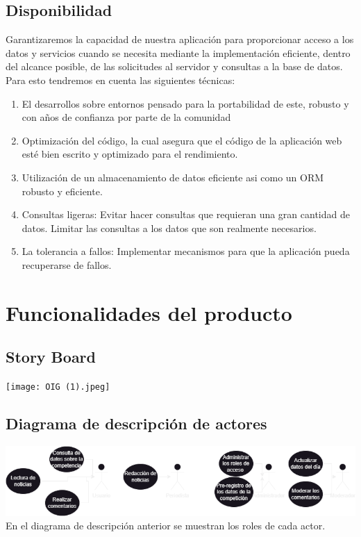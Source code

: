\documentclass{article} %
\begin{document}
\subsection{Disponibilidad}
 Garantizaremos la capacidad de nuestra aplicación para proporcionar
acceso a los datos y servicios cuando se necesita mediante la implementación eficiente,
dentro del alcance posible, de las solicitudes al servidor y consultas a la base de datos. Para
esto tendremos en cuenta las siguientes técnicas:
\begin{enumerate}
    \item El desarrollos sobre entornos pensado para la portabilidad de este, robusto y con años de confianza por parte de la comunidad
    \item Optimización del código, la cual asegura que el código de la aplicación web esté bien escrito y
optimizado para el rendimiento.
\item Utilización de un almacenamiento de datos eficiente asi como un ORM robusto y eficiente.
\item Consultas ligeras: Evitar hacer consultas que requieran una gran cantidad de datos.
Limitar las consultas a los datos que son realmente necesarios.
\item La tolerancia a fallos: Implementar mecanismos para que la aplicación pueda
recuperarse de fallos.

\end{enumerate}

\section{Funcionalidades del producto}
  \subsection{Story Board}
         \texttt{[image: OIG (1).jpeg]}
         
         \subsection{Diagrama de descripción de actores}
         \includegraphics[width=\textwidth, max height=\textheight, keepaspectratio]{Diagrama de descripcion de actores actualizado.png}
         En el diagrama de descripción anterior se muestran los roles de cada actor.
\end{document}

